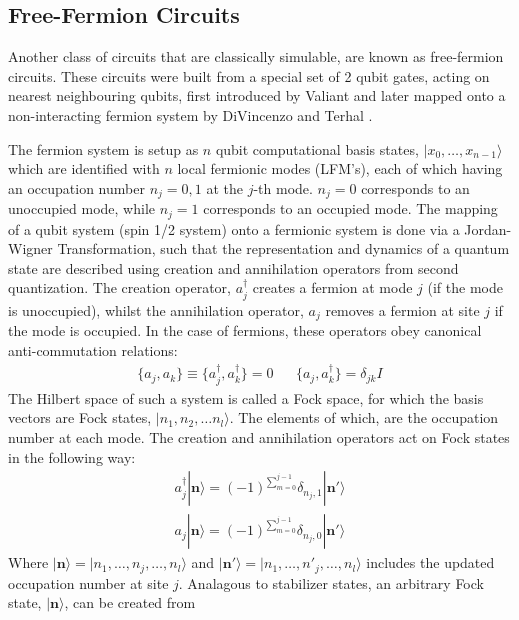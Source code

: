 \subsection{Free-Fermion Circuits}
Another class of circuits that are classically simulable, are known as free-fermion circuits. These
circuits were built from a special set of 2 qubit gates, acting on nearest neighbouring qubits, first
introduced by Valiant \cite{Valiant2001QuantumCT} and later mapped onto a non-interacting fermion system
by DiVincenzo and Terhal \cite{Terhal2001}.


The fermion system is setup as $n$ qubit computational
basis states, $|x_0, \dots, x_{n-1}\rangle$ which are identified with $n$ local fermionic modes
(LFM's), each of which having an occupation number $n_j = 0,1$ at the $j$-th mode. $n_j = 0$ corresponds
to an unoccupied mode, while $n_j = 1$ corresponds to an occupied mode. The mapping of a qubit system (spin 1/2 system) onto
a fermionic system is done via a Jordan-Wigner Transformation, such that the representation and dynamics of a quantum
state are described using creation and annihilation operators from second quantization.
The creation operator, $a_j^{\dagger}$ creates a fermion at mode $j$ (if the mode is unoccupied),
whilst the annihilation operator, $a_j$ removes a fermion at site $j$ if the mode is occupied.
In the case of fermions, these operators obey canonical anti-commutation relations:
\begin{align}
    \{a_j, a_k\} \equiv \{a_j^{\dagger}, a_k^{\dagger}\} = 0 &  & \{a_j, a_k^{\dagger}\} = \delta_{jk}I
\end{align}
The Hilbert space of such a system is called a Fock space, for which the basis vectors are Fock states,
$|n_1, n_2, \dots n_l\rangle$. The elements of which, are the occupation number at each mode.
The creation and annihilation operators act on Fock states in the following way:
\begin{align*}
    a_j^{\dagger} |\mathbf{n}\rangle = (-1)^{\sum^{j-1}_{m=0}}\delta_{n_j, 1}  |{\mathbf n}'\rangle \\
    a_j |\mathbf{n}\rangle = (-1)^{\sum^{j-1}_{m=0}}\delta_{n_j, 0}  |{\mathbf n}'\rangle
\end{align*}
Where $ |{\mathbf n}\rangle = |n_1, \dots, n_j, \dots, n_l\rangle$ and $ |{\mathbf n}'\rangle = |n_1, \dots, n'_j, \dots, n_l\rangle$
includes the updated occupation number at site $j$.
Analagous to stabilizer states, an arbitrary Fock state, $|{\mathbf n}\rangle$, can be created from
